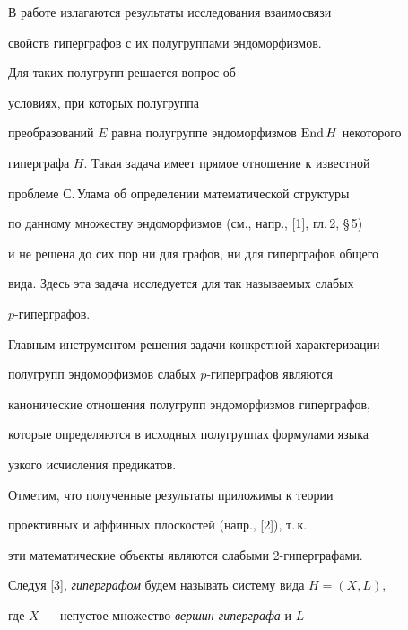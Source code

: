 \maketitle 


\label{begin} 


 


В работе излагаются результаты исследования взаимосвязи 


свойств гиперграфов с их полугруппами эндоморфизмов. 


Для таких полугрупп решается вопрос об 


условиях, при которых полугруппа 


преобразований $E$ равна полугруппе эндоморфизмов $\operatorname{End} H$ некоторого 


гиперграфа $H$. Такая задача имеет прямое отношение к известной 


проблеме С.\,Улама об определении математической структуры 


по данному множеству эндоморфизмов (см., напр., [1], гл.\,2, \S\,5) 


и не решена до сих пор ни для графов, ни для гиперграфов общего 


вида. Здесь эта задача исследуется для так называемых слабых 


$p$-гиперграфов. 


 


Главным инструментом решения задачи конкретной характеризации 


полугрупп эндоморфизмов слабых $p$-гиперграфов являются 


канонические отношения полугрупп эндоморфизмов гиперграфов, 


которые определяются в исходных полугруппах формулами языка 


узкого исчисления предикатов. 


 


Отметим, что полученные результаты приложимы к теории 


проективных и аффинных плоскостей (напр., [2]), т.\,к. 


эти математические объекты являются слабыми 2-гиперграфами. 


 


Следуя [3], {\it гиперграфом} будем называть систему вида $H=(X,L)$, 


где $X$ --- непустое множество {\it вершин гиперграфа} и $L$ --- 



